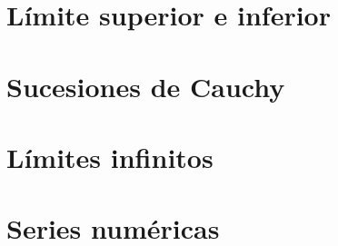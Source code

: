 \section{Límite superior e inferior}

\section{Sucesiones de Cauchy}

\section{Límites infinitos}

\section{Series numéricas}

